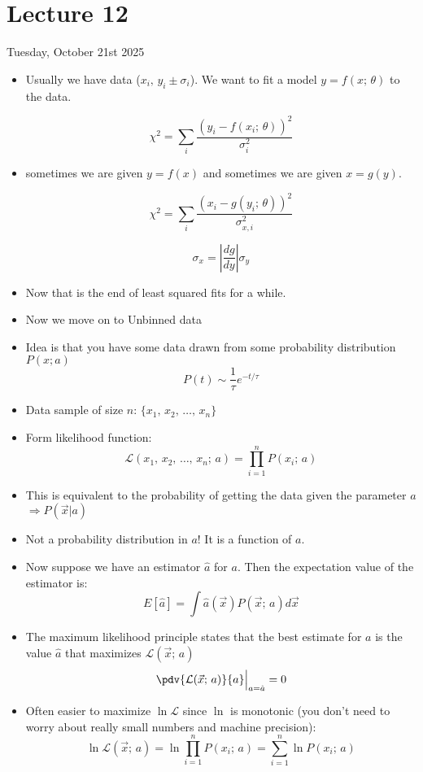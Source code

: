 \section{Lecture 12}

Tuesday, October 21st 2025

\begin{itemize}
    \item Usually we have data ($x_i, \, y_i \pm \sigma_i$). We want to fit a model $y = f(x; \, \theta)$ to the data.

          \[ \chi^2 = \sum_i \frac{(y_i - f(x_i; \, \theta))^2}{\sigma_i^2} \]

    \item sometimes we are given $y = f(x)$ and sometimes we are given $x = g(y)$.

          \[ \chi^2 = \sum_i \frac{(x_i - g(y_i; \, \theta))^2}{\sigma_{x,i}^2} \]

          \[ \sigma_x = \left| \frac{dg}{dy} \right| \sigma_y \]

    \item Now that is the end of least squared fits for a while.
    \item Now we move on to Unbinned data
    \item Idea is that you have some data drawn from some probability distribution $P(x;a)$
          \[ P(t) \sim \frac{1}{\tau} e^{-t/\tau} \]
    \item Data sample of size $n$: $\{x_1, \, x_2, \, \ldots, \, x_n\}$
    \item Form likelihood function:
          \[ \mathcal{L}(x_1, \, x_2, \, \ldots, \, x_n; \, a) = \prod_{i=1}^n P(x_i; \, a) \]
    \item This is equivalent to the probability of getting the data given the parameter $a$ $\Rightarrow P(\vec{x} | a)$
    \item Not a probability distribution in $a$! It is a function of $a$.
    \item Now suppose we have an estimator $\hat{a}$ for $a$. Then the expectation value of the estimator is:
          \[ E[\hat{a}] = \int \hat{a}(\vec{x}) P(\vec{x}; \, a) d\vec{x} \]
    \item The maximum likelihood principle states that the best estimate for $a$ is the value $\hat{a}$ that maximizes $\mathcal{L}(\vec{x}; \, a)$
          \[ \pdv{\mathcal{L}(\vec{x}; \, a)}{a} \Big|_{a = \hat{a}} = 0 \]

    \item Often easier to maximize $\ln \mathcal{L}$ since $\ln$ is monotonic (you don't need to worry about really small numbers and machine precision):
          \[ \ln \mathcal{L}(\vec{x}; \, a) = \ln{ \prod_{i=1}^n P(x_i; \, a)} = \sum_{i=1}^n \ln P(x_i; \, a) \]


\end{itemize}
